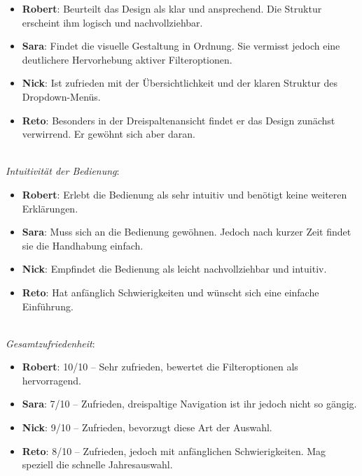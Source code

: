 \begin{itemize}
    \item \textbf{Robert}: 
          Beurteilt das Design als klar und ansprechend. 
          Die Struktur erscheint ihm logisch und nachvollziehbar. 
    \item \textbf{Sara}: 
          Findet die visuelle Gestaltung in Ordnung. 
          Sie vermisst jedoch eine deutlichere Hervorhebung aktiver Filteroptionen. 
    \item \textbf{Nick}: 
          Ist zufrieden mit der Übersichtlichkeit und der klaren Struktur des Drop\-down-Menüs. 
    \item \textbf{Reto}: 
          Besonders in der Dreispaltenansicht findet er das Design zunächst verwirrend. 
          Er gewöhnt sich aber daran. 
\end{itemize}

 \\
\emph{Intuitivität der Bedienung}: 

\begin{itemize}
    \item \textbf{Robert}: 
          Erlebt die Bedienung als sehr intuitiv und benötigt keine weiteren Erklärungen. 
    \item \textbf{Sara}: 
          Muss sich an die Bedienung gewöhnen. 
          Jedoch nach kurzer Zeit findet sie die Handhabung einfach. 
    \item \textbf{Nick}: 
          Empfindet die Bedienung als leicht nachvollziehbar und intuitiv. 
    \item \textbf{Reto}: 
          Hat anfänglich Schwierigkeiten und wünscht sich eine einfache Einführung. 
\end{itemize}

 \\
\emph{Gesamtzufriedenheit}: 

\begin{itemize}
    \item \textbf{Robert}: 
          {\color{editorGreen} 10/10} – Sehr zufrieden, bewertet die Filteroptionen als hervorragend. 
    \item \textbf{Sara}: 
          {\color{editorGreen} 7/10} – Zufrieden, dreispaltige Navigation ist ihr jedoch nicht so gängig. 
    \item \textbf{Nick}: 
          {\color{editorGreen} 9/10} – Zufrieden, bevorzugt diese Art der Auswahl. 
    \item \textbf{Reto}: 
          {\color{editorGreen} 8/10} – Zufrieden, jedoch mit anfänglichen Schwierigkeiten. 
          Mag speziell die schnelle Jahresauswahl. 
\end{itemize}

